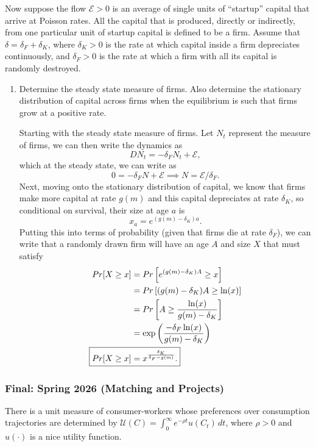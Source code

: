 \documentclass[11pt,english]{article}
\begin{document}
\noindent Now suppose the flow $\mathcal{E} > 0$ is an average of single units of ``startup'' capital that arrive at Poisson rates. All the capital that is produced, directly or indirectly, from one particular unit of startup capital is defined to be a firm. Assume that $\delta = \delta_F + \delta_K$, where $\delta_K > 0$ is the rate at which capital inside a firm depreciates continuously, and $\delta_F > 0$ is the rate at which a firm with all its capital is randomly destroyed.
\begin{enumerate}
    \item[\textbf{d.}] Determine the steady state measure of firms. Also determine the
        stationary distribution of capital across firms when the equilibrium is
        such that firms grow at a positive rate.
    \begin{solution}
 	Starting with the steady state measure of firms. Let $N_t$ represent the measure of firms, we can then write the dynamics as $$DN_t = -\delta_F N_t + \mathcal{E},$$which at the steady state, we can write as $$0 = -\delta_F N + \mathcal{E} \implies \boxed{N = \mathcal{E}/\delta_F.}$$ Next, moving onto the stationary distribution of capital, we know that firms make more capital at rate $g(m)$ and this capital depreciates at rate $\delta_K$, so conditional on survival, their size at age $a$ is $$x_a = e^{(g(m) - \delta_K)a}.$$ Putting this into terms of probability (given that firms die at rate $\delta_F$), we can write that a randomly drawn firm will have an age $A$ and size $X$ that must satisfy
\begin{align*}
Pr[X \geq x] &= Pr\left[e^{(g(m) - \delta_K)A} \geq x\right]\\
&= Pr\left[(g(m) - \delta_K)A \geq \ln(x)\right]\\
&= Pr\left[A \geq \frac{\ln(x)}{g(m) - \delta_K}\right]\\
&= \exp\left(\frac{-\delta_F \ln(x)}{g(m) - \delta_K}\right)\\
\Aboxed{Pr[X \geq x] &= x^{\frac{\delta_K}{\delta_F - g(m)}}.}
\end{align*}
    \end{solution}
 
\end{enumerate}

\subsubsection{Final: Spring 2026 (Matching and Projects)}
There is a unit measure of consumer-workers whose preferences over consumption
trajectories are determined by $\mathcal{U}(C) = \int_0^\infty e^{-\rho t}
u(C_t)\,dt$, where $\rho > 0$ and $u(\cdot)$ is a nice utility function.
 
\end{document}
